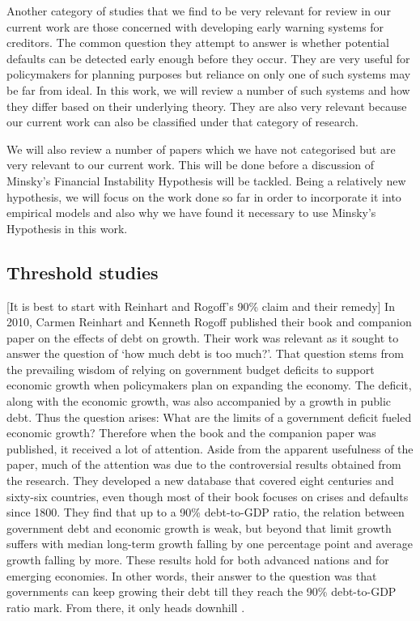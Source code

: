 \documentclass[12pt, a4paper]{article}
\begin{document}
	Another category of studies that we find to be very relevant for review in our current work are those concerned with developing early warning systems for creditors. The common question they attempt to answer is whether potential defaults can be detected early enough before they occur. They are very useful for policymakers for planning purposes but reliance on only one of such systems may be far from ideal. In this work, we will review a number of such systems and how they differ based on their underlying theory.  They are also very relevant because our current work can also be classified under that category of research.
	
	We will also review a number of papers which we have not categorised but are very relevant to our current work. This will be done before a discussion of Minsky's Financial Instability Hypothesis will be tackled. Being a relatively new hypothesis, we will focus on the work done so far in order to incorporate it into empirical models and also why we have found it necessary to use Minsky's Hypothesis in this work.
	
	
	\subsection{Threshold studies}
	[It is best to start with Reinhart and Rogoff's 90\% claim and their remedy]
	In 2010, Carmen Reinhart and Kenneth Rogoff published their book and companion paper on the effects of debt on growth. Their work was relevant as it sought to answer the question of `how much debt is too much?'. That question stems from the prevailing wisdom of relying on government budget deficits to support economic growth when policymakers plan on expanding the economy. The deficit, along with the economic growth, was also accompanied by a growth in public debt. Thus the question arises: What are the limits of a government deficit fueled economic growth? Therefore when the book and the companion paper was published, it received a lot of attention. Aside from the apparent usefulness of the paper, much of the attention was due to the controversial results obtained from the research. They developed a new database that covered eight centuries and sixty-six countries, even though most of their book focuses on crises and defaults since 1800. They find that up to a 90\% debt-to-GDP ratio, the relation between government debt and economic growth is weak, but beyond that limit growth suffers with median long-term growth falling by one percentage point and average growth falling by more. These results hold for both advanced nations and for emerging economies. In other words, their answer to the question was that governments can keep growing their debt till they reach the 90\% debt-to-GDP ratio mark. From there, it only heads downhill \cite{Reinhart2010}.
	
\end{document}
